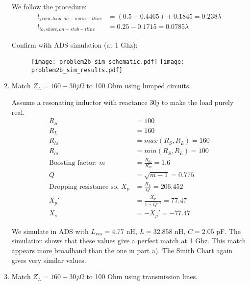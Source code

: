 \begin{enumerate}[label=(\alph*)]
    We follow the procedure:
    \begin{align*}
        l_{from,load,on-main-tline} &= (0.5 - 0.4465) + 0.1845 = 0.238 \lambda \\
        l_{to,short,on-stub-tline} &= 0.25 - 0.1715 = 0.0785 \lambda
    \end{align*}

    Confirm with ADS simulation (at 1 Ghz):
    \begin{figure}[H]
        \texttt{[image: problem2b\_sim\_schematic.pdf]}
        \endminipage\hfill
        \texttt{[image: problem2b\_sim\_results.pdf]}
        \endminipage
    \end{figure}

    \item Match $Z_L = 160 - 30j \Omega$ to 100 Ohm using lumped circuits.

    Assume a resonating inductor with reactance $30j$ to make the load purely real.
    \begin{align*}
        R_S &= 100 \\
        R_L &= 160 \\
        R_{hi} &= max(R_S, R_L) = 160 \\
        R_{lo} &= min(R_S, R_L) = 100 \\
        \text{Boosting factor: } m &= \frac{R_{hi}}{R_{lo}} = 1.6 \\
        Q &= \sqrt{m-1} = 0.775 \\
        \text{Dropping resistance so, } X_p &= \frac{R_L}{Q} = 206.452 \\
        X_p' &= \frac{X_p}{1 + Q^{-2}} = 77.47 \\
        X_s &= -X_p' = -77.47
    \end{align*}

    We simulate in ADS with $L_{res} = 4.77$ nH, $L = 32.858$ nH, $C = 2.05$ pF.
    The simulation shows that these values give a perfect match at 1 Ghz. This match appears more broadband than the one in part a). The Smith Chart again gives very similar values.

    \item Match $Z_L = 160-30j \Omega$ to 100 Ohm using transmission lines.


\end{enumerate}
